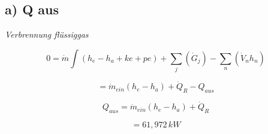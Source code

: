 \subsection*{a) Q aus}
\textit{Verbrennung flüssiggas}

\[
0 = \dot{m} \int (h_e - h_a + ke + pe) + \sum_j (\dot{G}_j) - \sum_n (\dot{V}_n h_n)
\]

\[
= \dot{m}_{ein} (h_e - h_a) + \dot{Q}_R - Q_{aus}
\]

\[
Q_{aus} = \dot{m}_{ein} (h_e - h_a) + \dot{Q}_R
\]

\[
= 61,972 \, kW
\]